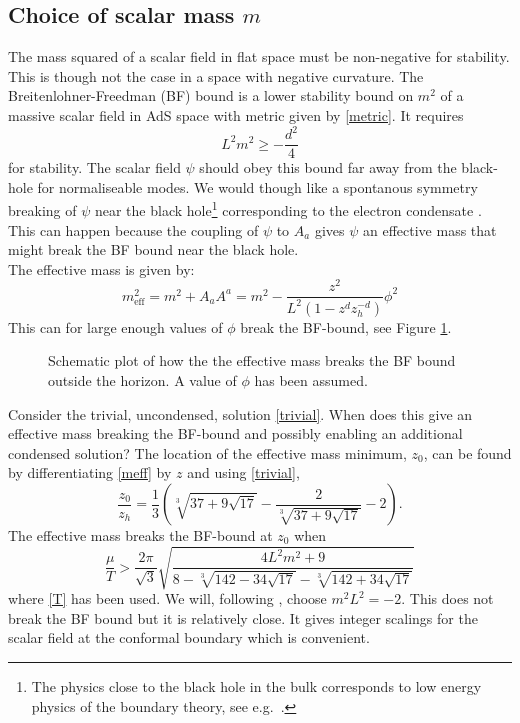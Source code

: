 \documentclass[12pt]{report}
\newcommand{\At}{\ensuremath{{\phi}}}
\begin{document}
\subsection{Choice of scalar mass $m$}
The mass squared of a scalar field in flat space must be non-negative for stability. This is though not the case in a space with negative curvature. The Breitenlohner-Freedman (BF) bound is a lower stability bound on $m^2$ of a massive scalar field in AdS space with metric given by \eqref{metric}. It requires
\begin{equation}
 L^2m^2\geq-\frac{d^2}{4}\label{BF}
\end{equation}
for stability\cite{Kleban:2004bv}. The scalar field $\psi$ should obey this bound far away from the black-hole for normaliseable modes. We would though like a spontanous symmetry breaking of $\psi$ near the black hole\footnote{The physics close to the black hole in the bulk corresponds to low energy physics of the boundary theory, see e.g.~\cite{McGreevy:2009xe}.} corresponding to the electron condensate \cite{Gubser:2008px}. This can happen because the coupling of $\psi$ to $A_a$ gives $\psi$ an effective mass that might break the BF bound near the black hole. \\The effective mass is given by:
\begin{equation}
 m_{\mathrm{eff}}^2=m^2+A_aA^a
=m^2-\frac{z^2}{L^2(1-z^dz_h^{-d})}\At^2
\label{meff}
\end{equation}
This can for large enough values of $\At$ break the BF-bound, see Figure \ref{BF}.
\begin{figure}
\centering

\caption{Schematic plot of how the the effective mass breaks the BF bound outside the horizon. A value of $\At$ has been assumed.\label{BF}}
\end{figure}
Consider the trivial, uncondensed, solution \eqref{trivial}. When does this give an effective mass breaking the BF-bound and possibly enabling an additional condensed solution? The location of the effective mass minimum, $z_0$, can be found by differentiating \eqref{meff} by $z$ and using \eqref{trivial},
\begin{equation}
\frac{z_0}{z_h}=\frac{1}{3} \left(\sqrt[3]{37+9 \sqrt{17}}-\frac{2}{\sqrt[3]{37+9 \sqrt{17}}}-2\right).
\end{equation}
The effective mass breaks the BF-bound at $z_0$ when
\begin{equation}
 \frac{\mu}{T}>
\frac{2\pi }{\sqrt{3}} \sqrt{\frac{4 L^2 m^2+9}{8-\sqrt[3]{142-34
   \sqrt{17}}-\sqrt[3]{142+34 \sqrt{17}}}}
\end{equation}
where \eqref{T} has been used. We will, following \cite{hartnoll8, horowitz}, choose $m^2L^2=-2$. This does not break the BF bound but it is relatively close. It gives integer scalings for the scalar field at the conformal boundary which is convenient.%
\end{document}
